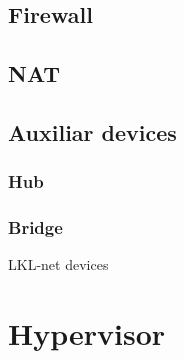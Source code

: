 \subsection{Firewall}
\label{sub-sec:firewall}

\subsection{NAT}
\label{sub-sec:nat}

\subsection{Auxiliar devices}
\label{sub-sec:auxdev}

\subsubsection{Hub}

\subsubsection{Bridge}

\begin{center}
  \begin{table}[htb]
    \caption{LKL-net devices}
    \label{table:tdevices}
  \end{table}
\end{center}

\section{Hypervisor}
\label{sub-sec:hypervisor}
